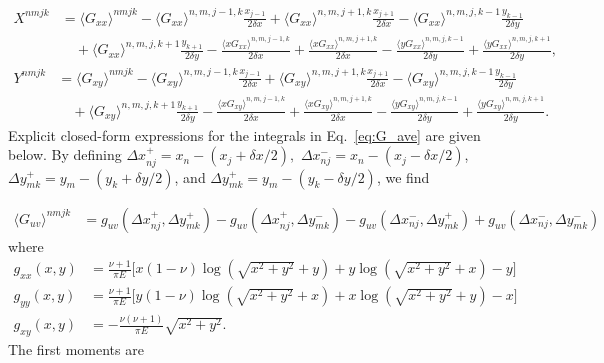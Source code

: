 \documentclass[aps,prl,reprint,twocolumn,groupedaddress,showpacs]{revtex4}
\begin{document}
\begin{widetext}
\begin{align}
X^{nmjk} & = \langle G_{xx} \rangle^{nmjk} - 
\langle G_{xx}\rangle^{n,m,j-1,k}\frac{x_{j-1}}{2\delta x}
+ \langle G_{xx} \rangle^{n,m,j+1,k}\frac{x_{j+1}}{2\delta x} 
-  \langle G_{xx} \rangle^{n,m,j,k-1}\frac{y_{k-1}}{2\delta y}  \nonumber\\
\: &\quad + \langle G_{xx} \rangle^{n,m,j,k+1}\frac{y_{k+1}}{2\delta y} 
-\frac{\langle xG_{xx} \rangle^{n,m,j-1,k}}{2\delta x}
+\frac{\langle xG_{xx} \rangle^{n,m,j+1,k}}{2\delta x} 
- \frac{\langle yG_{xx} \rangle^{n,m,j,k-1}}{2\delta y} 
+\frac{\langle yG_{xx} \rangle^{n,m,j,k+1}}{2\delta y}, 
\label{eq:linearsystemX}
\end{align}
\begin{align}
Y^{nmjk} & =  \langle G_{xy} \rangle^{nmjk} 
- \langle G_{xy} \rangle^{n,m,j-1,k}\frac{x_{j-1}}{2\delta x}
+\langle G_{xy} \rangle^{n,m,j+1,k}\frac{x_{j+1}}{2\delta x} 
- \langle G_{xy} \rangle^{n,m,j,k-1}\frac{y_{k-1}}{2\delta y} \nonumber\\
\: & \quad+\langle G_{xy} \rangle^{n,m,j,k+1}\frac{y_{k+1}}{2\delta y}  
-\frac{\langle xG_{xy} \rangle^{n,m,j-1,k}}{2\delta x}+
\frac{\langle xG_{xy} \rangle^{n,m,j+1,k}}{2\delta x} 
- \frac{\langle yG_{xy} \rangle^{n,m,j,k-1}}{2\delta y} 
+\frac{\langle yG_{xy} \rangle^{n,m,j,k+1}}{2\delta y}.
\label{eq:linearsystemY}
\end{align}
%
Explicit closed-form expressions for the integrals in
Eq.~\ref{eq:G_ave} are given below. By defining $\Delta x_{nj}^+ = x_n -
(x_j+\delta x/2),$ $\Delta x_{nj}^- = x_n - (x_j-\delta x/2)$, $\Delta
y_{mk}^+ = y_m - (y_k+\delta y/2)$, and $\Delta y_{mk}^+ = y_m -
(y_k-\delta y/2)$, we find

\begin{align}
\langle G_{uv}\rangle^{nmjk} &=   g_{uv}( \Delta x_{nj}^+,\Delta y_{mk}^+) - g_{uv}( \Delta x_{nj}^+,\Delta y_{mk}^-)
-g_{uv}(\Delta x_{nj}^-, \Delta y_{mk}^+) + g_{uv}(\Delta x_{nj}^- , \Delta y_{mk}^-)
\end{align}
where
\begin{align}
g_{xx}(x,y) &= \frac{\nu+1}{\pi E}\Bigg[ x(1-\nu ) \log\left( \sqrt{x^2+y^2}+y\right)
+ y \log\left(\sqrt{x^2+y^2} +x\right)-y  \Bigg] \label{eq:fxx} \\
g_{yy}(x,y) &= \frac{\nu+1}{\pi E}\Bigg[ y(1-\nu ) \log\left( \sqrt{x^2+y^2}+x\right)
+ x \log\left(\sqrt{x^2+y^2} +y\right)-x  \Bigg] \label{eq:fyy} \\
g_{xy}(x,y) &= -\frac{\nu(\nu+1)}{\pi E}\sqrt{x^2+y^2}. \label{eq:fxy}
\end{align}
%
The first moments are


\end{widetext}
\end{document}
